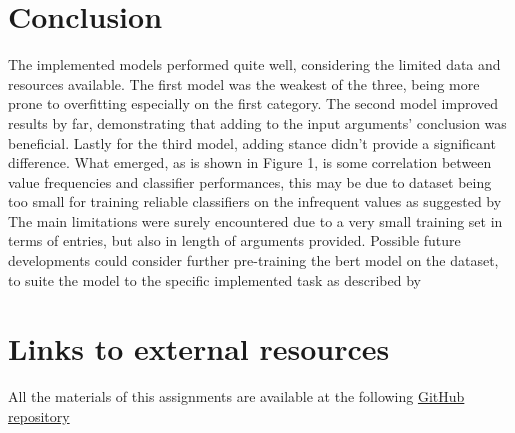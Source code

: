 \documentclass[11pt]{article}
\begin{document}
\section{Conclusion}
\label{sec:conclusion}

The implemented models performed quite well, considering the limited data and resources available. The first model was the weakest of the three, being more prone to overfitting especially on the first category.
The second model improved results by far, demonstrating that adding to the input arguments' conclusion was beneficial. Lastly for the third model, adding stance didn't provide a significant difference.
What emerged, as is shown in Figure 1, is some correlation between value frequencies and classifier performances, this may be due to dataset  being too small for training reliable classifiers on the infrequent values as suggested by \cite{kiesel-etal-2022-identifying}
The main limitations were surely encountered due to a very small training set in terms of entries, but also in length of arguments provided.
Possible future developments could consider further pre-training the bert model on the dataset, to suite the model to the specific implemented task as described by \cite{DBLP:conf/cncl/SunQXH19}



\section{Links to external resources}
All the materials of this assignments are available at the following 
\label{sec:links}
 \href{https://github.com/luke1399/Assignment2}{GitHub repository} 









\end{document}
